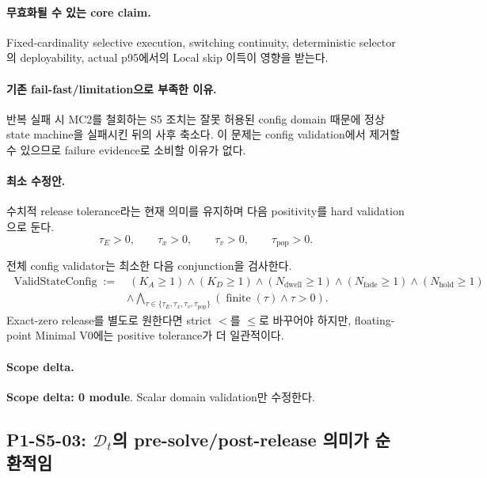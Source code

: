 \documentclass[11pt]{article}
\newcommand{\scopezero}{\textcolor{SafeGreen}{\textbf{Scope delta: 0 module}}}
\begin{document}
\paragraph{무효화될 수 있는 core claim.}
Fixed-cardinality selective execution, switching continuity, deterministic selector의 deployability,
actual p95에서의 Local skip 이득이 영향을 받는다.

\paragraph{기존 fail-fast/limitation으로 부족한 이유.}
반복 실패 시 MC2를 철회하는 S5 조치는 잘못 허용된 config domain 때문에 정상 state machine을 실패시킨 뒤의
사후 축소다. 이 문제는 config validation에서 제거할 수 있으므로 failure evidence로 소비할 이유가 없다.

\paragraph{최소 수정안.}
수치적 release tolerance라는 현재 의미를 유지하며 다음 positivity를 hard validation으로 둔다.
\begin{equation}
  \tau_E>0,\qquad
  \tau_x>0,\qquad
  \tau_v>0,\qquad
  \tau_{\mathrm{pop}}>0.
\end{equation}

전체 config validator는 최소한 다음 conjunction을 검사한다.
\begin{equation}
\begin{aligned}
\operatorname{ValidStateConfig}
:=&\ (K_A\geq1)\land(K_D\geq1)
\land(N_{\mathrm{dwell}}\geq1)
\land(N_{\mathrm{fade}}\geq1)
\land(N_{\mathrm{hold}}\geq1)\\
&\land\bigwedge_{\tau\in\{\tau_E,\tau_x,\tau_v,\tau_{\mathrm{pop}}\}}
\left(\operatorname{finite}(\tau)\land\tau>0\right).
\end{aligned}
\end{equation}
Exact-zero release를 별도로 원한다면 strict $<$를 $\leq$로 바꾸어야 하지만,
floating-point Minimal V0에는 positive tolerance가 더 일관적이다.

\paragraph{Scope delta.}
\scopezero. Scalar domain validation만 수정한다.

\subsection{P1-S5-03: $\mathcal D_t$의 pre-solve/post-release 의미가 순환적임}
\end{document}
